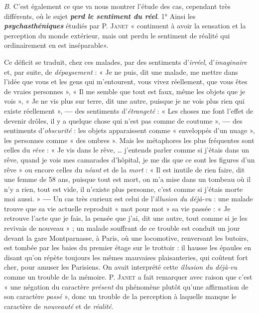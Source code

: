 {\it B.} C’est également ce que va nous montrer l’étude des cas, cependant
très différents, où le sujet \textbf{\textit {perd le sentiment du réel}}. 1° Ainsi
les \textbf{\textit {psychasthéniques}} étudiés par P. \textsc{Janet} « continuent à avoir la
sensation et la perception du monde extérieur, mais ont perdu le
sentiment de réalité qui ordinairement en est inséparable».

\vspace{0.24cm}
{\footnotesize 
Ce déficit se traduit, chez ces malades, par des sentiments d’\textsf{\textit {irréel}},
d’\textsf{\textit {imaginaire}}
et, par suite, de \textsf{\textit {dépaysement}} : « Je ne puis, dit une malade, me mettre
dans l’idée que vous et les gens qui m'entourent, vous vivez réellement,
que vous êtes de vraies personnes », « Il me semble que tout est faux, même
les objets que je vois », « Je ne vis plus sur terre, dit une autre, puisque je
ne vois plus rien qui existe réellement », {\bf —} des sentiments d’\textsf{\textit {étrangeté}} :
« Les choses me font l’effet de devenir drôles, il y a quelque chose qui n’est
pas comme de coutume », {\bf —} des sentiments d’\textsf{\textit {obscurité}} : les objets apparaissent
comme « enveloppés d’un nuage », les personnes comme « des
ombres ». Mais les métaphores les plus fréquentes sont celles du \textsf{\textit {rêve}} : « Je vis
dans le rêve, … j'entends parler comme si j'étais dans un rêve, quand je
vois mes camarades d'hôpital, je me dis que ce sont les figures d’un rêve »
ou encore celles du \textsf{\textit {néant}} et de la \textsf{\textit {mort}} :
« Il est inutile de rien faire, dit
une femme de 58 ans, puisque tout est mort, on m'a mise dans un tombeau
où il n'y a rien, tout est vide, il n'existe plus personne, c'est comme si
j'étais morte moi aussi. » {\bf —} Un cas très curieux est celui de l'\textsf{\textit {illusion du
déjà-vu}} : une malade trouve que sa vie actuelle reproduit « mot pour mot »
sa vie passée : « Je retrouve l'acte que je fais, la pensée que j'ai, dit une
autre, tout comme si je les revivais de nouveau » ; un malade souffrant de ce
trouble est conduit un jour devant la gare Montparnasse, à Paris, où une
locomotive, renversant les butoirs, est tombée par les baies du premier étage
sur le trottoir : il hausse les épaules en disant qu’on répète toujours les
mêmes mauvaises plaisanteries, qui coûtent fort cher, pour amuser les
Parisiens. On avait interprété cette {\it illusion du déjà-vu} comme un trouble de
la mémoire. P. \textsc{Janet} a fait remarquer avec raison que c'est « une négation
du caractère {\it présent} du phénomène plutôt qu’une affirmation de son caractère
{\it passé} », donc un trouble de la perception à laquelle manque le caractère
de {\it nouveauté} et de {\it réalité}.}
\vspace{0.31cm}

